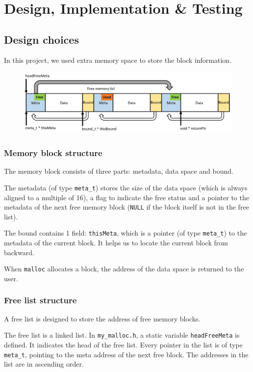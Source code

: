 \documentclass[a4paper,12pt]{article}
\begin{document}
	\section{Design, Implementation \& Testing}
	\subsection{Design choices}
	\par In this project, we used extra memory space to store the block information. 
	\begin{figure}[H]
		\centering
		\includegraphics[width=1.1\linewidth]{1.png}
	\end{figure}
	\subsubsection{Memory block structure}
	\par The memory block consists of three parts: metadata, data space and bound. 
	\par The metadata (of type \texttt{meta\_t}) stores the size of the data space (which is always aligned to a multiple of 16), a flag to indicate the free status and a pointer to the metadata of the next free memory block (\texttt{NULL} if the block itself is not in the free list). 
	\par The bound contains 1 field: \texttt{thisMeta}, which is a pointer (of type \texttt{meta\_t}) to the metadata of the current block. It helps us to locate the current block from backward. 
	\par When \texttt{malloc} allocates a block, the address of the data space is returned to the user. 
	\subsubsection{Free list structure}
	\par A free list is designed to store the address of free memory blocks. 
	\par The free list is a linked list. In \texttt{my\_malloc.h}, a static variable \texttt{headFreeMeta} is defined. It indicates the head of the free list. Every pointer in the list is of type \texttt{meta\_t}, pointing to the meta address of the next free block. The addresses in the list are in ascending order. 
\end{document}
